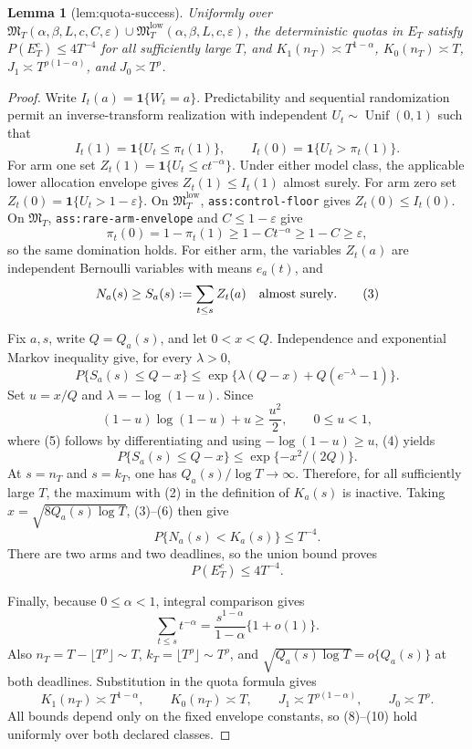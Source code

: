 \documentclass{article}
\newtheorem{lemma}{Lemma}
\begin{document}
\begin{lemma}[lem:quota-success]\label{lem:quota-success}
Uniformly over \(\mathfrak M_T(\alpha,\beta,L,c,C,\varepsilon)\cup\mathfrak M_T^{\mathrm{low}}(\alpha,\beta,L,c,\varepsilon)\), the deterministic quotas in \(E_T\) satisfy \(P(E_T^c)\leq4T^{-4}\) for all sufficiently large \(T\), and \(K_1(n_T)\asymp T^{1-\alpha}\), \(K_0(n_T)\asymp T\), \(J_1\asymp T^{\rho(1-\alpha)}\), and \(J_0\asymp T^\rho\).
\end{lemma}
\begin{proof}
Write \(I_t(a)=\mathbf 1\{W_t=a\}\).  Predictability and sequential randomization permit an inverse-transform realization with independent \(U_t\sim\operatorname{Unif}(0,1)\) such that
\[
 I_t(1)=\mathbf 1\{U_t\leq\pi_t(1)\},
 \qquad I_t(0)=\mathbf 1\{U_t>\pi_t(1)\}.                               \tag{1}
\]
For arm one set \(Z_t(1)=\mathbf 1\{U_t\leq ct^{-\alpha}\}\).  Under either model class, the applicable lower allocation envelope gives \(Z_t(1)\leq I_t(1)\) almost surely.  For arm zero set \(Z_t(0)=\mathbf 1\{U_t>1-\varepsilon\}\).  On \(\mathfrak M_T^{\mathrm{low}}\), \texttt{ass:control-floor} gives \(Z_t(0)\leq I_t(0)\).  On \(\mathfrak M_T\), \texttt{ass:rare-arm-envelope} and \(C\leq1-\varepsilon\) give
\[
 \pi_t(0)=1-\pi_t(1)\geq1-Ct^{-\alpha}\geq1-C\geq\varepsilon,          \tag{2}
\]
so the same domination holds.  For either arm, the variables \(Z_t(a)\) are independent Bernoulli variables with means \(e_a(t)\), and
\[
 N_a(s)\geq S_a(s):=\sum_{t\leq s}Z_t(a)\quad\hbox{almost surely}.       \tag{3}
\]

Fix \(a,s\), write \(Q=Q_a(s)\), and let \(0<x<Q\).  Independence and exponential Markov inequality give, for every \(\lambda>0\),
\[
 P\{S_a(s)\leq Q-x\}
 \leq \exp\{\lambda(Q-x)+Q(e^{-\lambda}-1)\}.                           \tag{4}
\]
Set \(u=x/Q\) and \(\lambda=-\log(1-u)\).  Since
\[
 (1-u)\log(1-u)+u\geq\frac{u^2}{2},\qquad 0\leq u<1,                    \tag{5}
\]
where (5) follows by differentiating and using \(-\log(1-u)\geq u\), (4) yields
\[
 P\{S_a(s)\leq Q-x\}\leq\exp\{-x^2/(2Q)\}.                            \tag{6}
\]
At \(s=n_T\) and \(s=k_T\), one has \(Q_a(s)/\log T\to\infty\).  Therefore, for all sufficiently large \(T\), the maximum with (2) in the definition of \(K_a(s)\) is inactive.  Taking \(x=\sqrt{8Q_a(s)\log T}\), (3)--(6) then give
\[
 P\{N_a(s)<K_a(s)\}\leq T^{-4}.                                       \tag{7}
\]
There are two arms and two deadlines, so the union bound proves
\[
 P(E_T^c)\leq4T^{-4}.                                                     \tag{8}
\]

Finally, because \(0\leq\alpha<1\), integral comparison gives
\[
 \sum_{t\leq s}t^{-\alpha}
 =\frac{s^{1-\alpha}}{1-\alpha}\{1+o(1)\}.                             \tag{9}
\]
Also \(n_T=T-\lfloor T^\rho\rfloor\sim T\), \(k_T=\lfloor T^\rho\rfloor\sim T^\rho\), and \(\sqrt{Q_a(s)\log T}=o\{Q_a(s)\}\) at both deadlines.  Substitution in the quota formula gives
\[
 K_1(n_T)\asymp T^{1-\alpha},\qquad K_0(n_T)\asymp T,
 \qquad J_1\asymp T^{\rho(1-\alpha)},\qquad J_0\asymp T^\rho.          \tag{10}
\]
All bounds depend only on the fixed envelope constants, so (8)--(10) hold uniformly over both declared classes.
\end{proof}
\end{document}
